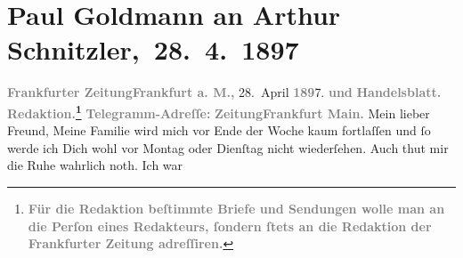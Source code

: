 

         
         \renewcommand{\erwaehntePersonen}{Personen:  ?? [blonder junger Musiker in Paris], Marie Reinhard, Dora Villé}
         \renewcommand{\erwaehnteInstitutionen}{Institutionen: Frankfurter Zeitung}
         \renewcommand{\erwaehnteOrte}{Orte: Berlin, Concert Parisien, Frankfurt am Main, Hotel Deutscher Kaiser, Hôtel de Ville, Panthéon, Paris}
         \renewcommand{\erwaehnteWerke}{}
               \section[ Paul Goldmann an Arthur Schnitzler, 28. 4. 1897]{ Paul Goldmann an Arthur Schnitzler, 28. 4. 1897}\nopagebreak{}\rehead{ }\begin{ledgroupsized}[t]{13cm}\normalsize\beginnumbering \toendnotes[C]{\smallbreak\pagebreak[2]} 
\toendnotes[C]{\smallbreak}\pstart
           \noindent{}{\pb}\textcolor{gray}{\textbf{Frankfurter Zeitung}}\hfill \textcolor{gray}{\textbf{Frankfurt a. M.,}}{ }28. April \textcolor{gray}{\textbf{189}}7.\pend
           \pstart
           \textcolor{gray}{\textbf{und}}\pend
           \pstart
           \textcolor{gray}{\textbf{Handelsblatt.}}\pend
           \pstart
           \textcolor{gray}{\textbf{Redaktion.\footnote{\noindent{}\textcolor{gray}{\textbf{Für die Redaktion beſtimmte Briefe und Sendungen wolle man
                                  an die Perſon eines Redakteurs,
                              ſondern ſtets \textbf{an die Redaktion der Frankfurter Zeitung} adreſſiren.}}}}}\pend
           \pstart
           \textcolor{gray}{\textbf{Telegramm-Adreſſe:}}\pend
           \pstart
           \textcolor{gray}{\textbf{ZeitungFrankfurt Main. }}\pend
           \pstart\center{}Mein lieber Freund,\pend\pstart
           Meine Familie wird mich vor Ende der Woche kaum fortlaſſen und ſo werde ich Dich wohl
               vor Montag oder Dienſtag nicht wiederſehen. Auch thut mir die Ruhe wahrlich noth. Ich war

\end{ledgroupsized}
